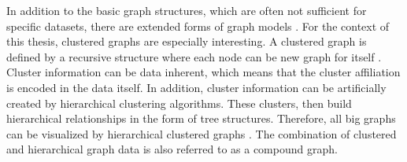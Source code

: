 In addition to the basic graph structures, which are often not sufficient for specific datasets, there are extended forms of graph models \cite{bertault_algorithm_1999}. 
For the context of this thesis, clustered graphs are especially interesting. A clustered graph is defined by a recursive structure where each node can be new graph for itself \cite{eades_multilevel_1997}. 
Cluster information can be data inherent, which means that the cluster affiliation is encoded in the data itself. In addition, cluster information can be artificially created by hierarchical clustering algorithms. These clusters, then build hierarchical relationships in the form of tree structures. Therefore, all big graphs can be visualized by hierarchical clustered graphs \cite{vehlow_state_2015}. The combination of clustered and hierarchical graph data is also referred to as a compound graph.  


